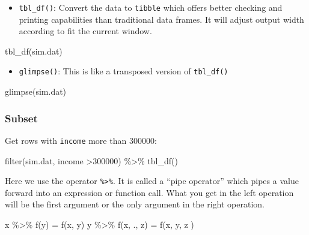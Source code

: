 \documentclass[
  12pt,
]{krantz}
\makeatletter
\newenvironment{Shaded}{\begin{snugshade}}{\end{snugshade}}
\newcommand{\DecValTok}[1]{\textcolor[rgb]{0.06,0.06,0.06}{#1}}
\newcommand{\FunctionTok}[1]{\textcolor[rgb]{0,0,0}{#1}}
\newcommand{\NormalTok}[1]{#1}
\newcommand{\OtherTok}[1]{\textcolor[rgb]{0.37,0.37,0.37}{#1}}
\newcommand{\SpecialCharTok}[1]{\textcolor[rgb]{0,0,0}{#1}}
\providecommand{\tightlist}{%
  \setlength{\itemsep}{0pt}\setlength{\parskip}{0pt}}
\newenvironment{kframe}{%
\medskip{}
\setlength{\fboxsep}{.8em}
 \def\at@end@of@kframe{}%
 \ifinner\ifhmode%
  \def\at@end@of@kframe{\end{minipage}}%
  \begin{minipage}{\columnwidth}%
 \fi\fi%
 \def\FrameCommand##1{\hskip\@totalleftmargin \hskip-\fboxsep
 \colorbox{shadecolor}{##1}\hskip-\fboxsep
     \hskip-\linewidth \hskip-\@totalleftmargin \hskip\columnwidth}%
 \MakeFramed {\advance\hsize-\width
   \@totalleftmargin\z@ \linewidth\hsize
   \@setminipage}}%
 {\par\unskip\endMakeFramed%
 \at@end@of@kframe}
\renewenvironment{Shaded}{\begin{kframe}}{\end{kframe}}
\makeatother
\begin{document}
\begin{itemize}
\tightlist
\item
  \texttt{tbl\_df()}: Convert the data to \texttt{tibble} which offers better checking and printing capabilities than traditional data frames. It will adjust output width according to fit the current window.
\end{itemize}

\begin{Shaded}
\begin{Highlighting}[]
\FunctionTok{tbl\_df}\NormalTok{(sim.dat)}
\end{Highlighting}
\end{Shaded}

\begin{itemize}
\tightlist
\item
  \texttt{glimpse()}: This is like a transposed version of \texttt{tbl\_df()}
\end{itemize}

\begin{Shaded}
\begin{Highlighting}[]
\FunctionTok{glimpse}\NormalTok{(sim.dat)}
\end{Highlighting}
\end{Shaded}

\hypertarget{subset}{%
\subsubsection{Subset}\label{subset}}

Get rows with \texttt{income} more than 300000:

\begin{Shaded}
\begin{Highlighting}[]
\FunctionTok{filter}\NormalTok{(sim.dat, income }\SpecialCharTok{\textgreater{}}\DecValTok{300000}\NormalTok{) }\SpecialCharTok{\%\textgreater{}\%}
  \FunctionTok{tbl\_df}\NormalTok{()}
\end{Highlighting}
\end{Shaded}

Here we use the operator \texttt{\%\textgreater{}\%}. It is called a ``pipe operator'' which pipes a value forward into an expression or function call. What you get in the left operation will be the first argument or the only argument in the right operation.

\begin{Shaded}
\begin{Highlighting}[]
\NormalTok{x }\SpecialCharTok{\%\textgreater{}\%} \FunctionTok{f}\NormalTok{(y) }\OtherTok{=} \FunctionTok{f}\NormalTok{(x, y)}
\NormalTok{y }\SpecialCharTok{\%\textgreater{}\%} \FunctionTok{f}\NormalTok{(x, ., z) }\OtherTok{=} \FunctionTok{f}\NormalTok{(x, y, z )}
\end{Highlighting}
\end{Shaded}
\end{document}
